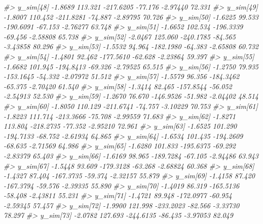 \documentclass[
  10pt,
  italian,
  a4paper,
  extrafontsizes,onecolumn,openright
  ]{memoir}
\newenvironment{Shaded}{\begin{snugshade}}{\end{snugshade}}
\newcommand{\CommentTok}[1]{\textcolor[rgb]{0.56,0.35,0.01}{\textit{#1}}}
\begin{document}
\begin{Shaded}
\begin{Highlighting}[]
\CommentTok{\#\textgreater{}   y\_sim[48]  {-}1.8689 113.321 {-}217.6205 {-}77.176 {-}2.97440 72.331}
\CommentTok{\#\textgreater{}   y\_sim[49]  {-}1.8007 110.452 {-}211.8281 {-}74.887 {-}2.89795 70.726}
\CommentTok{\#\textgreater{}   y\_sim[50]  {-}1.6225  99.533 {-}190.6091 {-}67.153 {-}2.76277 63.748}
\CommentTok{\#\textgreater{}   y\_sim[51]  {-}1.6652 102.534 {-}196.3339 {-}69.456 {-}2.58808 65.738}
\CommentTok{\#\textgreater{}   y\_sim[52]  {-}2.0467 125.060 {-}240.1785 {-}84.565 {-}3.43858 80.296}
\CommentTok{\#\textgreater{}   y\_sim[53]  {-}1.5532  94.964 {-}182.1980 {-}64.383 {-}2.65808 60.732}
\CommentTok{\#\textgreater{}   y\_sim[54]  {-}1.4801  92.462 {-}177.5610 {-}62.628 {-}2.23864 59.397}
\CommentTok{\#\textgreater{}   y\_sim[55]  {-}1.6682 101.945 {-}194.8413 {-}69.326 {-}2.79525 65.515}
\CommentTok{\#\textgreater{}   y\_sim[56]  {-}1.2750  79.935 {-}153.1645 {-}54.332 {-}2.07972 51.512}
\CommentTok{\#\textgreater{}   y\_sim[57]  {-}1.5579  96.356 {-}184.3462 {-}65.375 {-}2.70420 61.540}
\CommentTok{\#\textgreater{}   y\_sim[58]  {-}1.3414  82.465 {-}157.8544 {-}56.052 {-}2.54913 52.530}
\CommentTok{\#\textgreater{}   y\_sim[59]  {-}1.2670  76.670 {-}146.9526 {-}51.982 {-}2.04402 48.514}
\CommentTok{\#\textgreater{}   y\_sim[60]  {-}1.8050 110.129 {-}211.6741 {-}74.757 {-}3.10229 70.753}
\CommentTok{\#\textgreater{}   y\_sim[61]  {-}1.8223 111.714 {-}213.3666 {-}75.708 {-}2.99559 71.683}
\CommentTok{\#\textgreater{}   y\_sim[62]  {-}1.8271 113.804 {-}218.2735 {-}77.352 {-}2.95210 72.961}
\CommentTok{\#\textgreater{}   y\_sim[63]  {-}1.6525 101.290 {-}194.7133 {-}68.752 {-}2.61934 64.865}
\CommentTok{\#\textgreater{}   y\_sim[64]  {-}1.6534 101.435 {-}194.2609 {-}68.635 {-}2.71569 64.986}
\CommentTok{\#\textgreater{}   y\_sim[65]  {-}1.6280 101.833 {-}195.6375 {-}69.292 {-}2.83379 65.403}
\CommentTok{\#\textgreater{}   y\_sim[66]  {-}1.6169  98.965 {-}189.7284 {-}67.105 {-}2.94486 63.943}
\CommentTok{\#\textgreater{}   y\_sim[67]  {-}1.5448  93.609 {-}179.3128 {-}63.268 {-}2.68824 60.368}
\CommentTok{\#\textgreater{}   y\_sim[68]  {-}1.4327  87.404 {-}167.3735 {-}59.374 {-}2.32157 55.879}
\CommentTok{\#\textgreater{}   y\_sim[69]  {-}1.4158  87.420 {-}167.3794 {-}59.576 {-}2.39335 55.890}
\CommentTok{\#\textgreater{}   y\_sim[70]  {-}1.4019  86.319 {-}165.5136 {-}58.408 {-}2.43811 55.231}
\CommentTok{\#\textgreater{}   y\_sim[71]  {-}1.4721  89.948 {-}172.0977 {-}60.954 {-}2.59345 57.457}
\CommentTok{\#\textgreater{}   y\_sim[72]  {-}1.9900 121.998 {-}233.2023 {-}82.566 {-}3.33730 78.297}
\CommentTok{\#\textgreater{}   y\_sim[73]  {-}2.0782 127.693 {-}244.6135 {-}86.435 {-}3.97053 82.049}

\end{Highlighting}
\end{Shaded}
\end{document}
